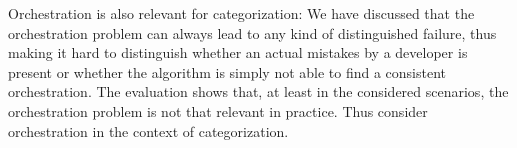 Orchestration is also relevant for categorization:
We have discussed that the orchestration problem can always lead to any kind of distinguished failure, thus making it hard to distinguish whether an actual mistakes by a developer is present or whether the algorithm is simply not able to find a consistent orchestration.
The evaluation shows that, at least in the considered scenarios, the orchestration problem is not that relevant in practice.
Thus consider orchestration in the context of categorization.




